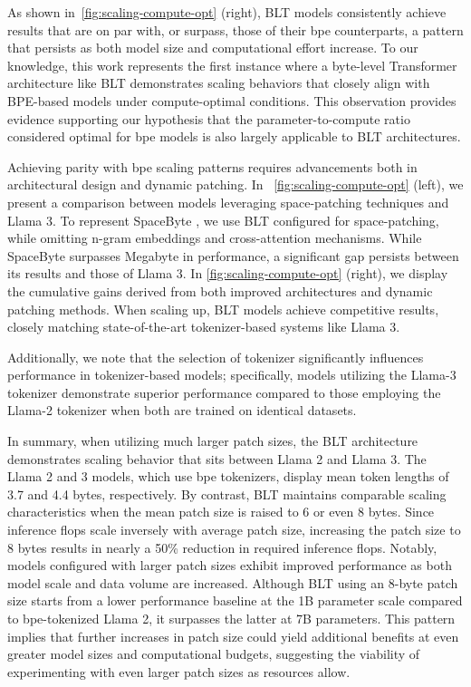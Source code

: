 As shown in~\autoref{fig:scaling-compute-opt} (right), {\textsc BLT} models consistently achieve results that are on par with, or surpass, those of their bpe counterparts, a pattern that persists as both model size and computational effort increase. To our knowledge, this work represents the first instance where a byte-level Transformer architecture like {\textsc BLT} demonstrates scaling behaviors that closely align with BPE-based models under compute-optimal conditions. This observation provides evidence supporting our hypothesis that the parameter-to-compute ratio considered optimal for bpe models is also largely applicable to {\textsc BLT} architectures.

Achieving parity with bpe scaling patterns requires advancements both in architectural design and dynamic patching. In ~\autoref{fig:scaling-compute-opt} (left), we present a comparison between models leveraging space-patching techniques and Llama 3. To represent SpaceByte \citep{slagle2024spacebyte}, we use {\textsc BLT} configured for space-patching, while omitting n-gram embeddings and cross-attention mechanisms. While SpaceByte surpasses Megabyte in performance, a significant gap persists between its results and those of Llama 3. In \autoref{fig:scaling-compute-opt} (right), we display the cumulative gains derived from both improved architectures and dynamic patching methods. When scaling up, {\textsc BLT} models achieve competitive results, closely matching state-of-the-art tokenizer-based systems like Llama 3.

Additionally, we note that the selection of tokenizer significantly influences performance in tokenizer-based models; specifically, models utilizing the Llama-3 tokenizer demonstrate superior performance compared to those employing the Llama-2 tokenizer when both are trained on identical datasets.

In summary, when utilizing much larger patch sizes, the {\textsc BLT} architecture demonstrates scaling behavior that sits between Llama 2 and Llama 3. The Llama 2 and 3 models, which use bpe tokenizers, display mean token lengths of 3.7 and 4.4 bytes, respectively. By contrast, {\textsc BLT} maintains comparable scaling characteristics when the mean patch size is raised to 6 or even 8 bytes. Since inference flops scale inversely with average patch size, increasing the patch size to 8 bytes results in nearly a 50\% reduction in required inference flops. Notably, models configured with larger patch sizes exhibit improved performance as both model scale and data volume are increased. Although {\textsc BLT} using an 8-byte patch size starts from a lower performance baseline at the 1B parameter scale compared to bpe-tokenized Llama 2, it surpasses the latter at 7B parameters. This pattern implies that further increases in patch size could yield additional benefits at even greater model sizes and computational budgets, suggesting the viability of experimenting with even larger patch sizes as resources allow.

